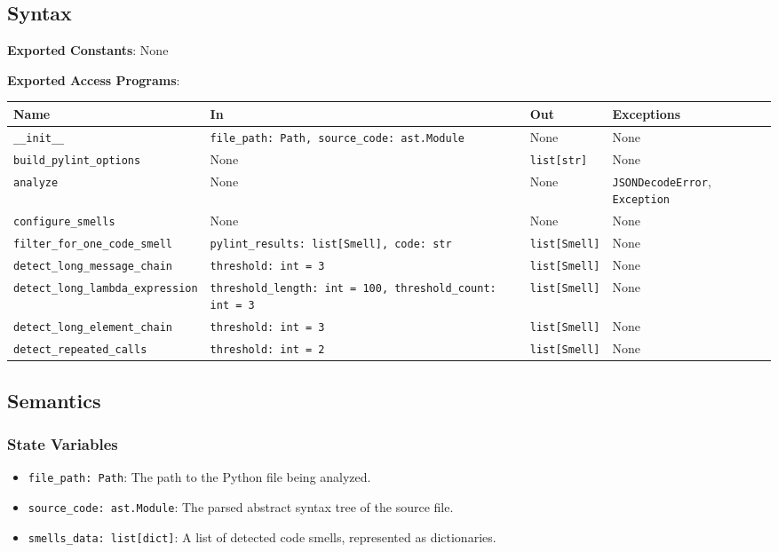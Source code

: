 \documentclass[12pt, titlepage]{article}
\begin{document}
\subsection{Syntax}
\noindent
\textbf{Exported Constants}: None

\noindent
\textbf{Exported Access Programs}:\\
{\footnotesize
\begin{tabularx}{\linewidth}{|
    l|
    >{\raggedright\arraybackslash}X|
    l|
    l|}
  \toprule Name & In & Out & Exceptions \\
  \midrule
  \texttt{\_\_init\_\_} & \texttt{file\_path: Path, source\_code: ast.Module} & None & None \\
  \hline
  \texttt{build\_pylint\_options} & None & \texttt{list[str]} & None \\
  \hline
  \texttt{analyze} & None & None & \texttt{JSONDecodeError}, \texttt{Exception} \\
  \hline
  \texttt{configure\_smells} & None & None & None \\
  \hline
  \texttt{filter\_for\_one\_code\_smell} & \texttt{pylint\_results: list[Smell], code: str} & \texttt{list[Smell]} & None \\
  \hline
  \texttt{detect\_long\_message\_chain} & \texttt{threshold: int = 3} & \texttt{list[Smell]} & None \\
  \hline
  \texttt{detect\_long\_lambda\_expression} & \texttt{threshold\_length: int = 100, threshold\_count: int = 3} & \texttt{list[Smell]} & None \\
  \hline
  \texttt{detect\_long\_element\_chain} & \texttt{threshold: int = 3} & \texttt{list[Smell]} & None \\
  \hline
  \texttt{detect\_repeated\_calls} & \texttt{threshold: int = 2} & \texttt{list[Smell]} & None \\
  \bottomrule
\end{tabularx}
}

\subsection{Semantics}

\subsubsection{State Variables}
\begin{itemize}
  \item \texttt{file\_path: Path}: The path to the Python file being analyzed.
  \item \texttt{source\_code: ast.Module}: The parsed abstract syntax tree of the source file.
  \item \texttt{smells\_data: list[dict]}: A list of detected code smells, represented as dictionaries.
\end{itemize}
\end{document}
